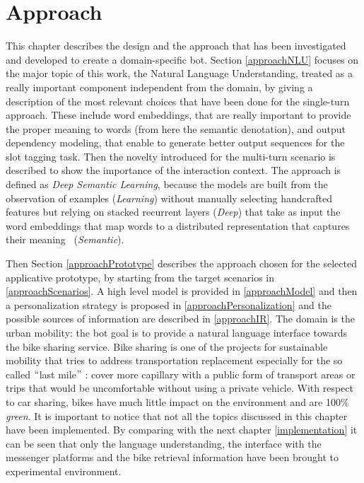


\chapter{Approach}
\label{approach}

This chapter describes the design and the approach that has been investigated and developed to create a domain-specific bot. Section \ref{approachNLU} focuses on the major topic of this work, the Natural Language Understanding, treated as a really important component independent from the domain, by giving a description of the most relevant choices that have been done for the single-turn approach. These include word embeddings, that are really important to provide the proper meaning to words (from here the semantic denotation), and output dependency modeling, that enable to generate better output sequences for the slot tagging task. Then the novelty introduced for the multi-turn scenario is described to show the importance of the interaction context. The approach is defined as \textit{Deep Semantic Learning}, because the models are built from the observation of examples (\textit{Learning}) without manually selecting handcrafted features but relying on stacked recurrent layers (\textit{Deep}) that take as input the word embeddings that map words to a distributed representation that captures their meaning~\cite{sahlgren2008distributional} (\textit{Semantic}).

Then Section \ref{approachPrototype} describes the approach chosen for the selected applicative prototype, by starting from the target scenarios in \ref{approachScenarios}. A high level model is provided in \ref{approachModel} and then a personalization strategy is proposed in \ref{approachPersonalization} and the possible sources of information are described in \ref{approachIR}. The domain is the urban mobility: the bot goal is to provide a natural language interface towards the bike sharing service. Bike sharing is one of the projects for sustainable mobility that tries to address transportation replacement especially for the so called $``$last mile$"$ : cover more capillary with a public form of transport areas or trips that would be uncomfortable without using a private vehicle. With respect to car sharing, bikes have much little impact on the environment and are 100$\%$  \textit{green}. It is important to notice that not all the topics discussed in this chapter have been implemented. By comparing with the next chapter \ref{implementation} it can be seen that only the language understanding, the interface with the messenger platforms and the bike retrieval information have been brought to experimental environment.

